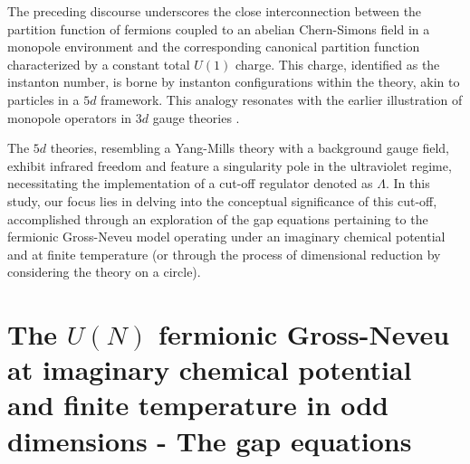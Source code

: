 \documentclass[twoside]{article}
\begin{document}
The preceding discourse underscores the close interconnection between the partition function of fermions coupled to an abelian Chern-Simons field in a monopole environment and the corresponding canonical partition function characterized by a constant total $U(1)$ charge. This charge, identified as the instanton number, is borne by instanton configurations within the theory, akin to particles in a $5d$ framework. This analogy resonates with the earlier illustration of monopole operators in $3d$ gauge theories \cite{Genolini}. 

The $5d$ theories, resembling a Yang-Mills theory with a background gauge field, exhibit infrared freedom and feature a singularity pole in the ultraviolet regime, necessitating the implementation of a cut-off regulator denoted as $\Lambda$. In this study, our focus lies in delving into the conceptual significance of this cut-off, accomplished through an exploration of the gap equations pertaining to the fermionic Gross-Neveu model operating under an imaginary chemical potential and at finite temperature (or through the process of dimensional reduction by considering the theory on a circle).

\section{The $U(N)$ fermionic Gross-Neveu at imaginary chemical potential and finite temperature in odd dimensions - The gap equations}
\end{document}

